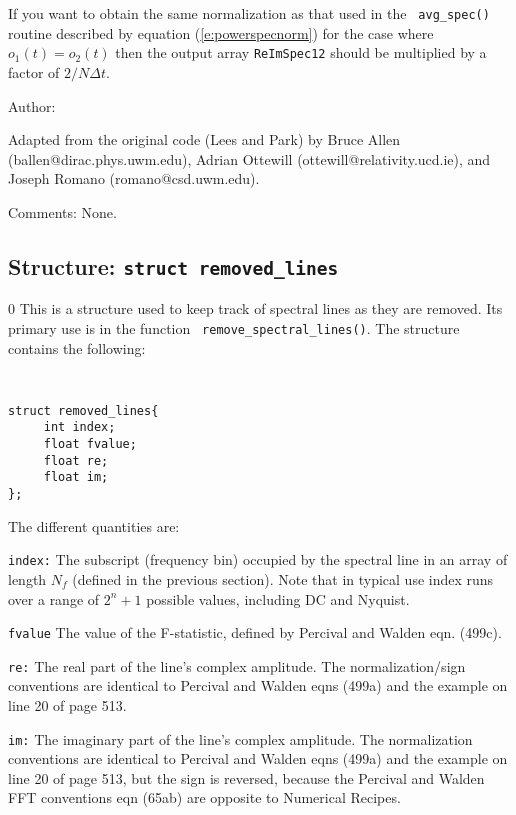 If you want to obtain the same normalization as that used in the {\tt
avg\_spec()} routine described by equation (\ref{e:powerspecnorm}) for
the case where $o_1(t)=o_2(t)$ then the output array {\tt ReImSpec12}
should be multiplied by a factor of $2/ N \Delta t$.

\begin{description}
\item{Author:}

Adapted from the original code (Lees and Park) by 
Bruce Allen (ballen@dirac.phys.uwm.edu), 
Adrian Ottewill (ottewill@relativity.ucd.ie), and
Joseph Romano (romano@csd.uwm.edu).
\item{Comments:}
None.
\end{description}
\clearpage

\subsection{Structure: {\tt struct removed\_lines} }
\setcounter{equation}0
This is a structure used to keep track of spectral lines as
they are removed.  Its primary use is in the function {\tt
remove\_spectral\_lines()}.  The structure contains the following:
{\tt
\begin{verbatim}
struct removed_lines{
     int index;
     float fvalue;
     float re;
     float im;
};
\end{verbatim}}
The different quantities are:
\begin{description}
\item{\tt index:} The subscript (frequency bin) occupied by the spectral
  line in an array of length $N_f$ (defined in the previous section).
  Note that in typical use index runs over a range of $2^n+1$ possible
  values, including DC and Nyquist.
\item{\tt fvalue} The value of the F-statistic, defined by Percival and
  Walden eqn. (499c).
\item{\tt re:} The real part of the line's complex amplitude.
  The normalization/sign conventions are identical to Percival and Walden
  eqns (499a) and the example on line 20 of page 513.
\item{\tt im:} The imaginary part of the line's complex amplitude.
  The normalization
  conventions are identical to Percival and Walden eqns (499a) and the
  example on line 20 of page 513, but the sign is reversed, because
  the Percival and Walden FFT conventions eqn (65ab) are opposite to
  Numerical Recipes.
\end{description}
\clearpage

